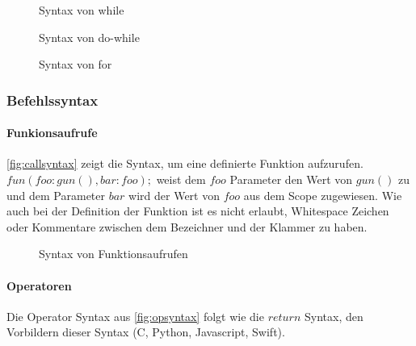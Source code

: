       \begin{figure}[H]
        \centering
        \caption{Syntax von while}
        \label{fig:whilesyntax}
      \end{figure}

      \begin{figure}[H]
        \centering
        \caption{Syntax von do-while}
        \label{fig:dowhilesyntax}
      \end{figure}

      \begin{figure}[H]
        \centering
        \caption{Syntax von for}
        \label{fig:forsyntax}
      \end{figure}

    \subsubsection{Befehlssyntax}
    \label{sssec:Befehlssyntax}
      \paragraph{Funkionsaufrufe}
        \autoref{fig:callsyntax} zeigt die Syntax, um eine definierte Funktion aufzurufen. \myMIn$fun(foo:gun(), bar:foo);$ weist dem \myMIn$foo$ Parameter den Wert von \myMIn$gun()$ zu und dem Parameter \myMIn$bar$ wird der Wert von \myMIn$foo$ aus dem Scope zugewiesen. Wie auch bei der Definition der Funktion ist es nicht erlaubt, Whitespace Zeichen oder Kommentare zwischen dem Bezeichner und der Klammer zu haben.
        \begin{figure}[H]
          \centering
          \caption{Syntax von Funktionsaufrufen}
          \label{fig:callsyntax}
        \end{figure}

      \paragraph{Operatoren}
        Die Operator Syntax aus \autoref{fig:opsyntax} folgt wie die \myMIn$return$ Syntax, den Vorbildern dieser Syntax (C, Python, Javascript, Swift).


